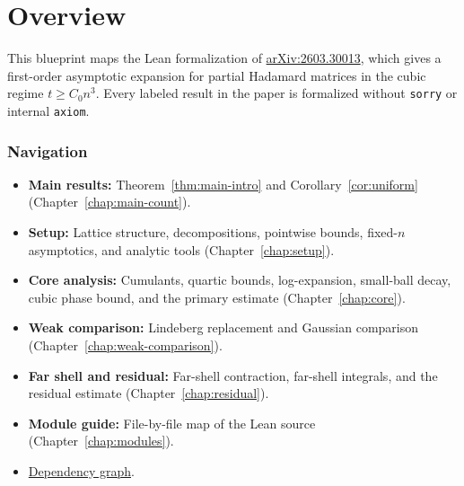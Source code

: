 \chapter{Overview}\label{chap:overview}

This blueprint maps the Lean formalization of
\href{https://arxiv.org/abs/2603.30013}{arXiv:2603.30013},
which gives a first-order asymptotic expansion for partial Hadamard
matrices in the cubic regime $t\ge C_0 n^3$.
Every labeled result in the paper is formalized without
\texttt{sorry} or internal \texttt{axiom}.

\subsection*{Navigation}

\begin{itemize}
\item \textbf{Main results:}
  Theorem~\ref{thm:main-intro} and Corollary~\ref{cor:uniform}
  (Chapter~\ref{chap:main-count}).
\item \textbf{Setup:}
  Lattice structure, decompositions, pointwise bounds, fixed-$n$
  asymptotics, and analytic tools
  (Chapter~\ref{chap:setup}).
\item \textbf{Core analysis:}
  Cumulants, quartic bounds, log-expansion, small-ball decay, cubic
  phase bound, and the primary estimate
  (Chapter~\ref{chap:core}).
\item \textbf{Weak comparison:}
  Lindeberg replacement and Gaussian comparison
  (Chapter~\ref{chap:weak-comparison}).
\item \textbf{Far shell and residual:}
  Far-shell contraction, far-shell integrals, and the residual estimate
  (Chapter~\ref{chap:residual}).
\item \textbf{Module guide:}
  File-by-file map of the Lean source
  (Chapter~\ref{chap:modules}).
\item \hyperref[dep_graph]{Dependency graph}.
\end{itemize}
